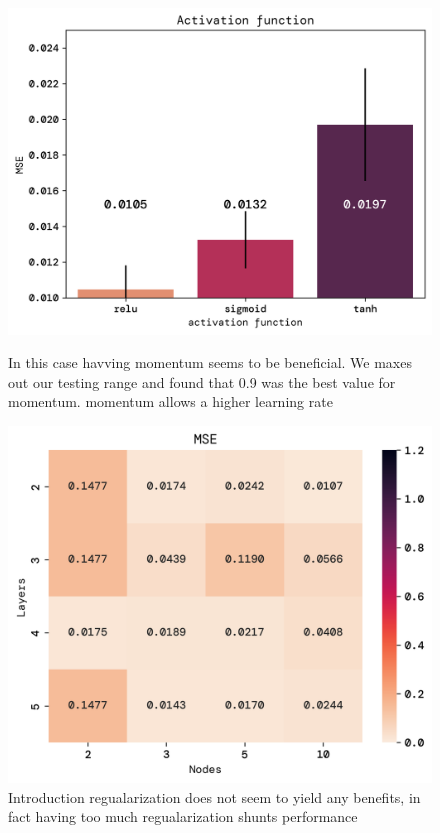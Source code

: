 \documentclass[twoside,11pt]{report}
\begin{document}
\begin{figure}[!ht]
    \begin{minipage}[t]{0.5\textwidth - 1mm}
        \begin{center}
            \includegraphics[width=\textwidth]{../runsAndFigures/MSE_activs.png}
        \end{center}
        \caption{In this case havving momentum seems to be beneficial. We maxes out our testing range and found that 0.9 was the best value for momentum. momentum allows a higher learning rate}\label{fig:accuracy_optimizer}
    \end{minipage}
    \hspace{2mm}
    \begin{minipage}[t]{0.5\textwidth - 1mm}
        \begin{center}
            \includegraphics[width=\textwidth]{../runsAndFigures/MSE_layers_nodes.png}
        \end{center}
        \caption{Introduction regualarization does not seem to yield any benefits, in fact
        having too much regualarization shunts performance}\label{fig:accuracy_aplha}
    \end{minipage}
\end{figure}
\end{document}
